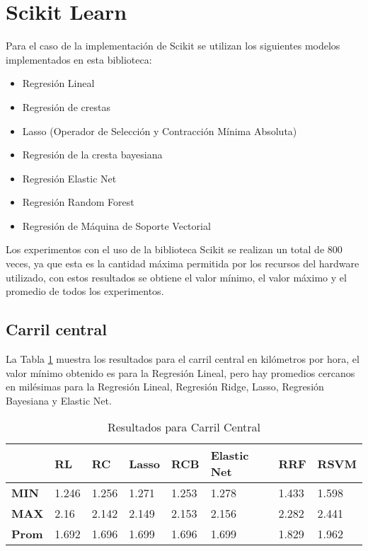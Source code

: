 \section{Scikit Learn}

Para el caso de la implementación de Scikit se utilizan los siguientes modelos implementados en esta biblioteca:

\begin{itemize}
    \item Regresión Lineal
    \item Regresión de crestas
    \item Lasso (Operador de Selección y Contracción Mínima Absoluta)
    \item Regresión de la cresta bayesiana
    \item Regresión Elastic Net
    \item Regresión Random Forest
    \item Regresión de Máquina de Soporte Vectorial
\end{itemize}

Los experimentos con el uso de la biblioteca Scikit se realizan un total de 800 veces, ya que esta es la cantidad máxima permitida por los recursos del hardware utilizado, con estos resultados se obtiene el valor mínimo, el valor máximo y el promedio de todos los experimentos.

\subsection{Carril central}

La Tabla \ref{tab:resultadosScikitCarrilCentral} muestra los resultados para el carril central en kilómetros por hora, el valor mínimo obtenido es para la Regresión Lineal, pero hay promedios cercanos en milésimas para la Regresión Lineal, Regresión Ridge, Lasso, Regresión Bayesiana y Elastic Net.

\begin{table}[H]
    \centering
    \caption{Resultados para Carril Central}
    \label{tab:resultadosScikitCarrilCentral}
    \begin{tabular}{|l|l|l|l|l|l|l|l|} \hline
        & \textbf{RL} & \textbf{RC} & \textbf{Lasso} & \textbf{RCB} & \textbf{Elastic Net} & \textbf{RRF} & \textbf{RSVM} \\ \hline

        \textbf{MIN} & 1.246 & 1.256 & 1.271 & 1.253 & 1.278 & 1.433 & 1.598 \\ \hline
        \textbf{MAX} & 2.16 & 2.142 & 2.149 & 2.153 & 2.156 & 2.282 & 2.441 \\ \hline
        \textbf{Prom} & 1.692 & 1.696 & 1.699 & 1.696 & 1.699 & 1.829 & 1.962 \\ \hline
    \end{tabular}
\end{table}


